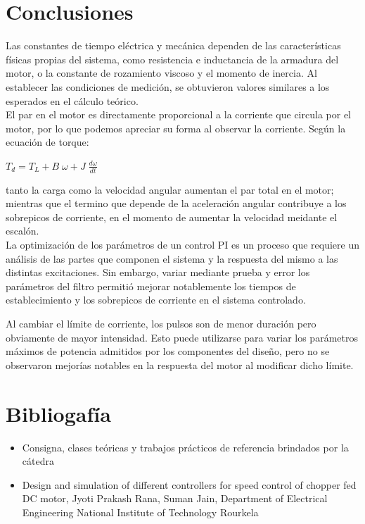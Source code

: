 \documentclass[11pt, a4paper]{article}
\begin{document}
\clearpage

\section{Conclusiones} 

Las constantes de tiempo eléctrica y mecánica dependen de las características físicas propias del sistema, como resistencia e inductancia de la armadura del motor, o la constante de rozamiento viscoso y el momento de inercia. Al establecer las condiciones de medición, se obtuvieron valores similares a los esperados en el cálculo teórico.\\
El par en el motor es directamente proporcional a la corriente que circula por el motor, por lo que podemos apreciar su forma al observar la corriente. Según la ecuación de torque:
\begin{center}
$T_d=T_L+B\;\omega+J\;\frac{d\omega}{dt}$
\end{center}
tanto la carga como la velocidad angular aumentan el par total en el motor; mientras que el termino que depende de la aceleración angular contribuye a los sobrepicos de corriente, en el momento de aumentar la velocidad meidante el escalón.\\
La optimización de los parámetros de un control PI es un proceso que requiere un análisis de las partes que componen el sistema y la respuesta del mismo a las distintas excitaciones. Sin embargo, variar mediante prueba y error los parámetros del filtro permitió mejorar notablemente los tiempos de establecimiento y los sobrepicos de corriente en el sistema controlado.

Al cambiar el límite de corriente, los pulsos son de menor duración pero obviamente de mayor intensidad. Esto puede utilizarse para variar los parámetros máximos de potencia admitidos por los componentes del diseño, pero no se observaron mejorías notables en la respuesta del motor al modificar dicho límite.

\section{Bibliogafía}
\begin{itemize}
\item Consigna, clases teóricas y trabajos prácticos de referencia brindados por la cátedra
\item Design and simulation of different controllers for speed control of chopper fed DC motor, Jyoti Prakash Rana, Suman Jain, Department of Electrical Engineering National Institute of Technology Rourkela
\end{itemize}
\end{document}
